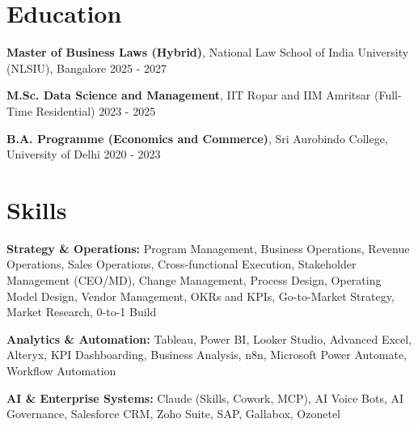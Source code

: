 \documentclass[10pt,a4paper]{article}
\begin{document}
\section{Education}
\textbf{Master of Business Laws (Hybrid)}, National Law School of India University (NLSIU), Bangalore \hfill 2025 - 2027\par
\textbf{M.Sc. Data Science and Management}, IIT Ropar and IIM Amritsar (Full-Time Residential) \hfill 2023 - 2025\par
\textbf{B.A. Programme (Economics and Commerce)}, Sri Aurobindo College, University of Delhi \hfill 2020 - 2023\par

\section{Skills}
\textbf{Strategy \& Operations:} Program Management, Business Operations, Revenue Operations, Sales Operations,
Cross-functional Execution, Stakeholder Management (CEO/MD), Change Management, Process Design, Operating Model Design,
Vendor Management, OKRs and KPIs, Go-to-Market Strategy, Market Research, 0-to-1 Build\par
\vspace{1pt}
\textbf{Analytics \& Automation:} Tableau, Power BI, Looker Studio, Advanced Excel, Alteryx, KPI Dashboarding, Business
Analysis, n8n, Microsoft Power Automate, Workflow Automation\par
\vspace{1pt}
\textbf{AI \& Enterprise Systems:} Claude (Skills, Cowork, MCP), AI Voice Bots, AI Governance, Salesforce CRM, Zoho
Suite, SAP, Gallabox, Ozonetel\par
\end{document}
